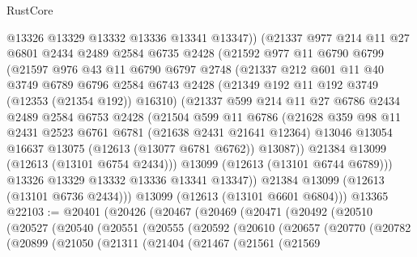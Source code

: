\begin{lexlean}{RustCore}
\begin{coremodule}
          @13326
          @13329
          @13332
          @13336
          @13341
          @13347))
      (@21337
        @977
        @214
        @11
        @27
        @6801
        @2434
        @2489
        @2584
        @6735
        @2428
        (@21592
          @977
          @11
          @6790
          @6799
          (@21597
            @976
            @43
            @11
            @6790
            @6797
            @2748
            (@21337
              @212
              @601
              @11
              @40
              @3749
              @6789
              @6796
              @2584
              @6743
              @2428
              (@21349 @192 @11 @192 @3749 (@12353 (@21354 @192)) @16310)
              (@21337
                @599
                @214
                @11
                @27
                @6786
                @2434
                @2489
                @2584
                @6753
                @2428
                (@21504
                  @599
                  @11
                  @6786
                  (@21628
                    @359
                    @98
                    @11
                    @2431
                    @2523
                    @6761
                    @6781
                    (@21638 @2431 @21641 @12364)
                    @13046
                    @13054
                    @16637
                    @13075
                    (@12613 (@13077 @6781 @6762))
                    @13087))
                @21384
                @13099
                (@12613 (@13101 @6754 @2434)))
              @13099
              (@12613 (@13101 @6744 @6789)))
            @13326
            @13329
            @13332
            @13336
            @13341
            @13347))
        @21384
        @13099
        (@12613 (@13101 @6736 @2434)))
      @13099
      (@12613 (@13101 @6601 @6804)))
    @13365
@22103 := @20401
    (@20426
      (@20467
        (@20469
          (@20471
            (@20492
              (@20510
                (@20527
                  (@20540
                    (@20551
                      (@20555
                        (@20592
                          (@20610
                            (@20657
                              (@20770
                                (@20782
                                  (@20899
                                    (@21050
                                      (@21311
                                        (@21404
                                          (@21467
                                            (@21561
                                              (@21569

\end{coremodule}
\end{lexlean}
